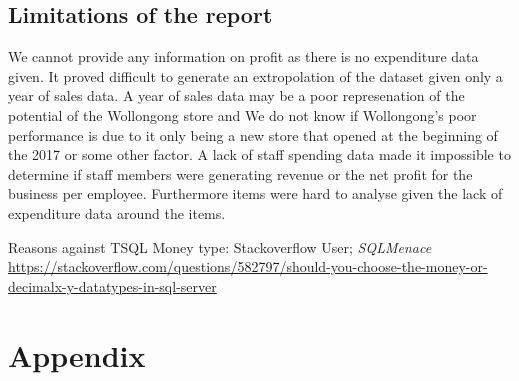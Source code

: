 \documentclass{article}
\begin{document}
    \subsection{Limitations of the report}
        We cannot provide any information on profit as there is no expenditure data given. 
        It proved difficult to generate an extropolation of the dataset given only a year of 
        sales data. 
        A year of sales data may be a poor represenation of the potential of the Wollongong store and
        We do not know if Wollongong’s poor performance is due to it only being a new store that 
        opened at the beginning of the 2017 or some other factor. 
        A lack of staff spending data made it impossible to determine if staff members were generating
        revenue or the net profit for the business per employee.
        Furthermore items were hard to analyse given the lack of expenditure data around
        the items.

    
\newpage

    \begin{thebibliography}{9}
        \raggedright
            Reasons against TSQL Money type: Stackoverflow User; \textit{SQLMenace}
            \url{https://stackoverflow.com/questions/582797/should-you-choose-the-money-or-decimalx-y-datatypes-in-sql-server}
    \end{thebibliography}


\newpage

    \section{Appendix}
    \label{sec:Appendix}
\end{document}
